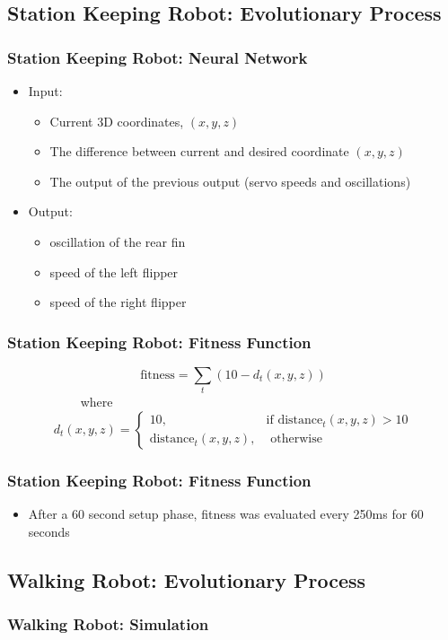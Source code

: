 \documentclass{beamer}
\begin{document}
\subsection{Station Keeping Robot: Evolutionary Process}
\begin{frame}
  \frametitle{Station Keeping Robot: Neural Network}
\begin{itemize}
\item Input: 
\begin{itemize}
\item Current 3D coordinates, $(x,y,z)$
\item The difference between current and desired coordinate  $(x,y,z)$
\item The output of the previous output (servo speeds and oscillations)
\end{itemize}
\item Output:
\begin{itemize}
\item oscillation of the rear fin
\item speed of the left flipper
\item speed of the right flipper
\end{itemize}
\end{itemize}
\end{frame}

\begin{frame}
  \frametitle{Station Keeping Robot: Fitness Function}
\begin{equation*}
	\textrm{fitness} = \sum_{t} (10 - d_t(x, y, z))
\end{equation*}
~~~~~~~~~~~  where
\[
	d_t(x, y, z) = 
		\begin{cases} 10, & \textrm{if distance}_t(x, y, z) > 10 \\
					  \textrm{distance}_t(x, y, z), & \textrm{ otherwise}
		\end{cases}
\]
\end{frame}

\begin{frame}
  \frametitle{Station Keeping Robot: Fitness Function}
\begin{itemize}
\item After a 60 second setup phase, fitness was evaluated every 250ms for 60 seconds
\end{itemize}
\end{frame}

\subsection{Walking Robot: Evolutionary Process}
\begin{frame}
  \frametitle{Walking Robot: Simulation}
\end{frame}
\end{document}
